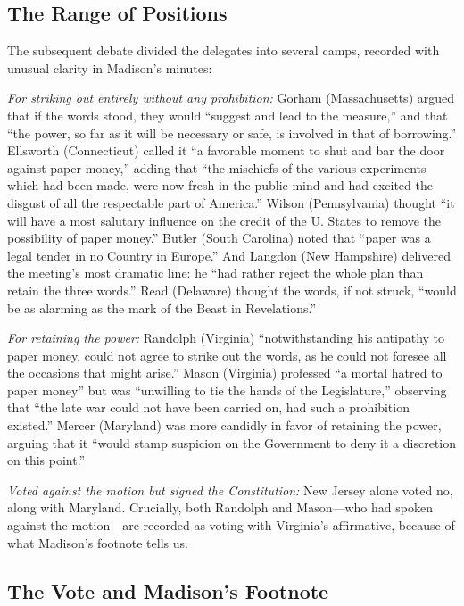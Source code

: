 \documentclass[12pt]{article}
\begin{document}
\subsection{The Range of Positions}

The subsequent debate divided the delegates into several camps, recorded
with unusual clarity in Madison's minutes:

\textit{For striking out entirely without any prohibition:} Gorham
(Massachusetts) argued that if the words stood, they would ``suggest
and lead to the measure,'' and that ``the power, so far as it will
be necessary or safe, is involved in that of borrowing.'' Ellsworth
(Connecticut) called it ``a favorable moment to shut and bar the door
against paper money,'' adding that ``the mischiefs of the various
experiments which had been made, were now fresh in the public mind
and had excited the disgust of all the respectable part of America.''
Wilson (Pennsylvania) thought ``it will have a most salutary influence
on the credit of the U. States to remove the possibility of paper
money.'' Butler (South Carolina) noted that ``paper was a legal tender
in no Country in Europe.'' And Langdon (New Hampshire) delivered the
meeting's most dramatic line: he ``had rather reject the whole plan
than retain the three words.'' Read (Delaware) thought the words,
if not struck, ``would be as alarming as the mark of the Beast in
Revelations.''

\textit{For retaining the power:} Randolph (Virginia) ``notwithstanding
his antipathy to paper money, could not agree to strike out the words,
as he could not foresee all the occasions that might arise.'' Mason
(Virginia) professed ``a mortal hatred to paper money'' but was
``unwilling to tie the hands of the Legislature,'' observing that
``the late war could not have been carried on, had such a prohibition
existed.'' Mercer (Maryland) was more candidly in favor of retaining
the power, arguing that it ``would stamp suspicion on the Government
to deny it a discretion on this point.''

\textit{Voted against the motion but signed the Constitution:}
New Jersey alone voted no, along with Maryland. Crucially, both
Randolph and Mason---who had spoken against the motion---are recorded
as voting with Virginia's affirmative, because of what Madison's
footnote tells us.

\subsection{The Vote and Madison's Footnote}
\end{document}
